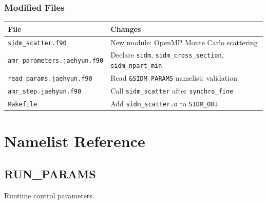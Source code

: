 \documentclass[11pt,fleqn]{book}
\begin{document}
\section{Modified Files}

\begin{longtable}{L{6.5cm} L{7cm}}
\toprule
\textbf{File} & \textbf{Changes} \\
\midrule
\endhead
\texttt{sidm\_scatter.f90} & New module: OpenMP Monte Carlo scattering \\
\texttt{amr\_parameters.jaehyun.f90} & Declare \texttt{sidm}, \texttt{sidm\_cross\_section}, \texttt{sidm\_npart\_min} \\
\texttt{read\_params.jaehyun.f90} & Read \texttt{\&SIDM\_PARAMS} namelist; validation \\
\texttt{amr\_step.jaehyun.f90} & Call \texttt{sidm\_scatter} after \texttt{synchro\_fine} \\
\texttt{Makefile} & Add \texttt{sidm\_scatter.o} to \texttt{SIDM\_OBJ} \\
\bottomrule
\end{longtable}


\part{Namelist Reference}

\chapter{RUN\_PARAMS}

Runtime control parameters.
\end{document}
